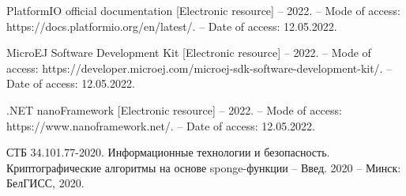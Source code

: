 \begin{thebibliography}{1}
	 PlatformIO official documentation [Electronic resource] -- 2022. -- Mode of access:
	https://docs.platformio.org/en/latest/. -- Date of access: 12.05.2022.
	
	 MicroEJ Software Development Kit [Electronic resource] -- 2022. -- Mode of access:
	https://developer.microej.com/microej-sdk-software-development-kit/. -- Date of access: 12.05.2022.
	
	 .NET nanoFramework [Electronic resource] -- 2022. -- Mode of access:
	https://www.nanoframework.net/. -- Date of access: 12.05.2022.
	
	 СТБ 34.101.77-2020. Информационные технологии и безопасность. Криптографические 
	алгоритмы на основе sponge-функции -- Введ. 2020 -- Минск: БелГИСС, 2020.
 	
\end{thebibliography}